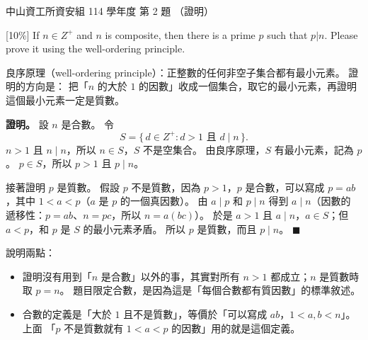 \begin{pastexam}[label={px:nsysu-114-dmalg-02}]{中山資工所資安組 114 學年度 第 2 題}
（證明）

{[10\%]} If $n \in Z^+$ and $n$ is composite, then there is a prime $p$ such that $p | n$. Please
prove it using the well-ordering principle.
\end{pastexam}

\begin{pastsoln}
良序原理（well-ordering principle）：正整數的任何非空子集合都有最小元素。 證明的方向是：
把「$n$ 的大於 $1$ 的因數」收成一個集合，取它的最小元素，再證明這個最小元素一定是質數。

\textbf{證明。} 設 $n$ 是合數。 令
\[
S = \{\, d \in Z^+ : d > 1 \text{ 且 } d \mid n \,\}.
\]
$n > 1$ 且 $n \mid n$，所以 $n \in S$，$S$ 不是空集合。 由良序原理，$S$ 有最小元素，記為 $p$。
$p \in S$，所以 $p > 1$ 且 $p \mid n$。

接著證明 $p$ 是質數。 假設 $p$ 不是質數，因為 $p > 1$，$p$ 是合數，可以寫成 $p = ab$，其中
$1 < a < p$（$a$ 是 $p$ 的一個真因數）。 由 $a \mid p$ 和 $p \mid n$ 得到 $a \mid n$（因數的
遞移性：$p = ab$、$n = pc$，所以 $n = a(bc)$）。 於是 $a > 1$ 且 $a \mid n$，$a \in S$；但
$a < p$，和 $p$ 是 $S$ 的最小元素矛盾。 所以 $p$ 是質數，而且 $p \mid n$。 \hfill$\blacksquare$

說明兩點：
\begin{itemize}
\item 證明沒有用到「$n$ 是合數」以外的事，其實對所有 $n > 1$ 都成立；$n$ 是質數時取 $p = n$。
題目限定合數，是因為這是「每個合數都有質因數」的標準敘述。
\item 合數的定義是「大於 $1$ 且不是質數」，等價於「可以寫成 $ab$，$1 < a, b < n$」。 上面
「$p$ 不是質數就有 $1 < a < p$ 的因數」用的就是這個定義。
\end{itemize}
\end{pastsoln}
